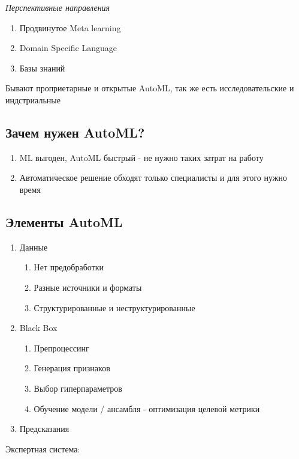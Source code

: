 \documentclass[a4paper, 12pt]{article}
\begin{document}
\textit{Перспективные направления}

\begin{enumerate}
    \item Продвинутое Meta learning
    \item Domain Specific Language
    \item Базы знаний
\end{enumerate}

Бывают проприетарные и открытые AutoML, так же
есть исследовательские и индстриальные

\subsection{Зачем нужен AutoML?}

\begin{enumerate}
    \item ML выгоден, AutoML быстрый - не нужно таких затрат на работу
    \item Автоматическое решение обходят только специалисты и для этого нужно время
\end{enumerate}

\subsection{Элементы AutoML}

\begin{enumerate}
    \item Данные
    \begin{enumerate}
        \item Нет предобработки
        \item Разные источники и форматы
        \item Структурированные и неструктурированные
    \end{enumerate}
    \item Black Box
    \begin{enumerate}
        \item Препроцессинг
        \item Генерация признаков
        \item Выбор гиперпараметров
        \item Обучение модели / ансамбля - оптимизация целевой метрики
    \end{enumerate}
    \item Предсказания
\end{enumerate}

Экспертная система:
\end{document}
